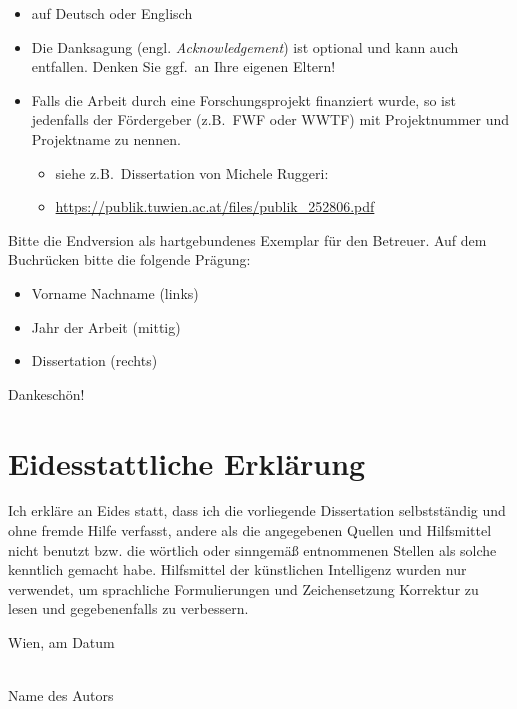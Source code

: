 \begin{itemize}
  \item auf Deutsch oder Englisch
  \item Die Danksagung (engl. {\em Acknowledgement}) ist optional und kann auch entfallen. Denken Sie ggf.\ an Ihre eigenen Eltern!

  \item Falls die Arbeit durch eine Forschungsprojekt finanziert wurde, so ist jedenfalls der Fördergeber (z.B.\ FWF oder WWTF) mit Projektnummer und
    Projektname zu nennen.
    \begin{itemize}
      \item siehe z.B.\ Dissertation von Michele Ruggeri:
      \item[] \href{https://publik.tuwien.ac.at/files/publik_252806.pdf}{\ttfamily https://publik.tuwien.ac.at/files/publik\_252806.pdf}
    \end{itemize}

\end{itemize}

\vfill

Bitte die Endversion als hartgebundenes Exemplar für den Betreuer. Auf dem Buchrücken bitte die folgende Prägung:
\begin{itemize}
  \item Vorname Nachname (links)
  \item Jahr der Arbeit (mittig)
  \item Dissertation (rechts)
\end{itemize}
Dankeschön!

\cleardoublepage


\chapter*{Eidesstattliche Erkl\"arung}
\thispagestyle{empty}

\vspace*{2cm}

Ich erkl\"are an Eides statt, dass ich die vorliegende Dissertation selbstst\"andig und ohne fremde Hilfe verfasst, andere als die angegebenen
Quellen und Hilfsmittel nicht benutzt bzw. die w\"ortlich oder sinngem\"a{\ss} entnommenen Stellen als solche kenntlich gemacht habe.
Hilfsmittel der künstlichen Intelligenz wurden nur verwendet,
um sprachliche Formulierungen und Zeichensetzung Korrektur zu lesen und gegebenenfalls zu verbessern.

\vspace*{3cm}

\noindent
Wien, am {\color{change}Datum} %
%
\hfill
%
\begin{minipage}[t]{5cm}
  \centering
  \underline{\hspace*{5cm}}\\
  \small\color{change}Name des Autors
\end{minipage}

\cleardoublepage